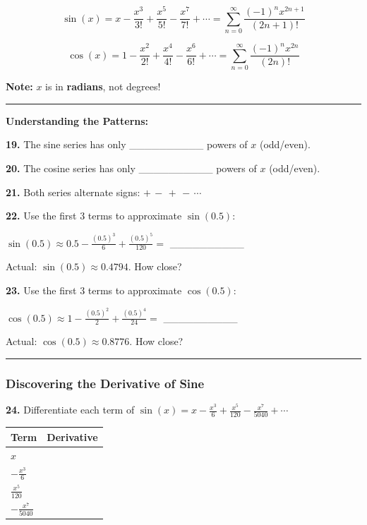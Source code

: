 \documentclass[
  11pt,
]{article}
\begin{document}
\[\boxed{\sin(x) = x - \frac{x^3}{3!} + \frac{x^5}{5!} - \frac{x^7}{7!} + \cdots = \sum_{n=0}^{\infty} \frac{(-1)^n x^{2n+1}}{(2n+1)!}}\]

\[\boxed{\cos(x) = 1 - \frac{x^2}{2!} + \frac{x^4}{4!} - \frac{x^6}{6!} + \cdots = \sum_{n=0}^{\infty} \frac{(-1)^n x^{2n}}{(2n)!}}\]

\textbf{Note:} \(x\) is in \textbf{radians}, not degrees!

\begin{center}\rule{0.5\linewidth}{0.5pt}\end{center}

\textbf{Understanding the Patterns:}

\textbf{19.} The sine series has only \_\_\_\_\_\_\_\_\_\_ powers of
\(x\) (odd/even).

\textbf{20.} The cosine series has only \_\_\_\_\_\_\_\_\_\_ powers of
\(x\) (odd/even).

\textbf{21.} Both series alternate signs: \(+ \, - \, + \, - \, \cdots\)

\textbf{22.} Use the first 3 terms to approximate \(\sin(0.5)\):

\(\sin(0.5) \approx 0.5 - \frac{(0.5)^3}{6} + \frac{(0.5)^5}{120} ={}\)
\_\_\_\_\_\_\_\_\_\_

Actual: \(\sin(0.5) \approx 0.4794\). How close?

\textbf{23.} Use the first 3 terms to approximate \(\cos(0.5)\):

\(\cos(0.5) \approx 1 - \frac{(0.5)^2}{2} + \frac{(0.5)^4}{24} ={}\)
\_\_\_\_\_\_\_\_\_\_

Actual: \(\cos(0.5) \approx 0.8776\). How close?

\begin{center}\rule{0.5\linewidth}{0.5pt}\end{center}

\hypertarget{discovering-the-derivative-of-sine}{%
\subsubsection{Discovering the Derivative of
Sine}\label{discovering-the-derivative-of-sine}}

\textbf{24.} Differentiate each term of
\(\sin(x) = x - \frac{x^3}{6} + \frac{x^5}{120} - \frac{x^7}{5040} + \cdots\)

\begin{longtable}[]{@{}ll@{}}
\toprule\noalign{}
Term & Derivative \\
\midrule\noalign{}
\endhead
\bottomrule\noalign{}
\endlastfoot
\(x\) & \\
\(-\frac{x^3}{6}\) & \\
\(\frac{x^5}{120}\) & \\
\(-\frac{x^7}{5040}\) & \\
\end{longtable}
\end{document}
